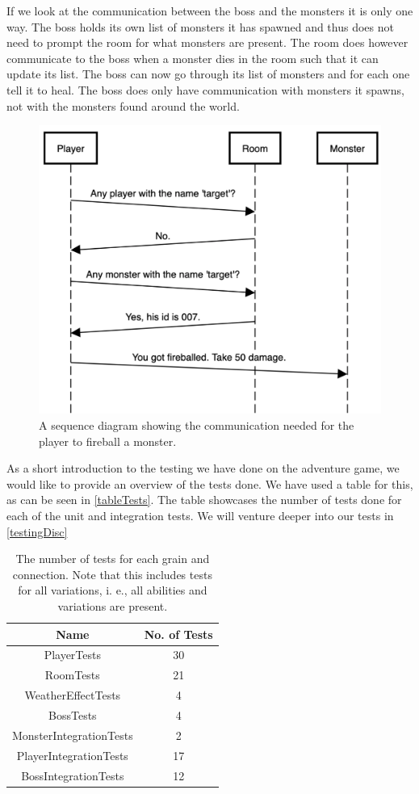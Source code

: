If we look at the communication between the boss and the monsters it is only one way. The boss holds its own list of monsters it has spawned and thus does not need to prompt the room for what monsters are present. The room does however communicate to the boss when a monster dies in the room such that it can update its list. The boss can now go through its list of monsters and for each one tell it to heal. The boss does only have communication with monsters it spawns, not with the monsters found around the world.\\

\begin{figure}[H]
	\centering
	\includegraphics[width=0.7\linewidth]{Materials/Adventuregame/SequenceDiagram}
	\caption{A sequence diagram showing the communication needed for the player to fireball a monster.}
	\label{PLayerFireballFlow}
\end{figure}

As a short introduction to the testing we have done on the adventure game, we would like to provide an overview of the tests done. We have used a table for this, as can be seen in \autoref{tableTests}. The table showcases the number of tests done for each of the unit and integration tests. We will venture deeper into our tests in \autoref{testingDisc}
\begin{table}[H]
	\centering
	\begin{tabular}{| c | c |} \hline
		\textbf{Name} & \textbf{No. of Tests} \\ \hline
		PlayerTests & 30 \\ \hline
		RoomTests & 21 \\ \hline
		WeatherEffectTests & 4 \\ \hline
		BossTests & 4 \\ \hline
		MonsterIntegrationTests & 2 \\ \hline
		PlayerIntegrationTests & 17 \\ \hline
		BossIntegrationTests & 12 \\ \hline
	\end{tabular}
	\caption{The number of tests for each grain and connection. Note that this includes tests for all variations, i. e., all abilities and variations are present.}
	\label{tableTests}
\end{table}

